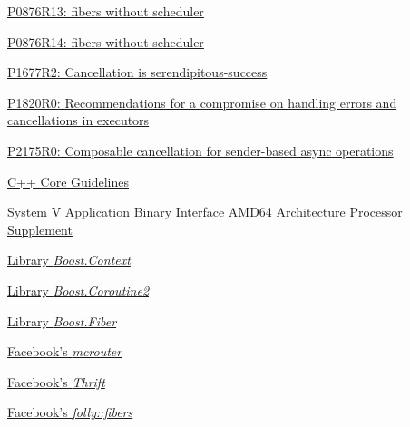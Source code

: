 \begin{thebibliography}{99}
        \href{https://www.open-std.org/jtc1/sc22/wg21/docs/papers/2023/p0876r13.pdf}
        {P0876R13: fibers without scheduler}

        \href{https://www.open-std.org/jtc1/sc22/wg21/docs/papers/2023/p0876r14.pdf}
        {P0876R14: fibers without scheduler}

        \href{https://www.open-std.org/jtc1/sc22/wg21/docs/papers/2019/p1677r2.pdf}
        {P1677R2: Cancellation is serendipitous-success}

        \href{https://www.open-std.org/jtc1/sc22/wg21/docs/papers/2019/p1820r0.html}
        {P1820R0: Recommendations for a compromise on handling errors and cancellations in executors}

        \href{https://www.open-std.org/jtc1/sc22/wg21/docs/papers/2020/p2175r0.html}
        {P2175R0: Composable cancellation for sender-based async operations}

        \href{http://isocpp.github.io/CppCoreGuidelines/CppCoreGuidelines#Ri-global}
        {C++ Core Guidelines}

        \href{http://software.intel.com/sites/default/files/article/402129/mpx-linux64-abi.pdf}
        {System V Application Binary Interface AMD64 Architecture Processor
        Supplement}

        \href{http://www.boost.org/doc/libs/release/libs/context/doc/html/index.html}
        {Library \emph{Boost.Context}}

        \href{http://www.boost.org/doc/libs/release/libs/coroutine2/doc/html/index.html}
        {Library \emph{Boost.Coroutine2}}

        \href{http://www.boost.org/doc/libs/release/libs/fiber/doc/html/index.html}
        {Library \emph{Boost.Fiber}}

        \href{https://code.facebook.com/posts/296442737213493/introducing-mcrouter-a-memcached-protocol-router-for-scaling-memcached-deployments}
        {Facebook's \emph{mcrouter}}

        \href{https://github.com/facebook/fbthrift}
        {Facebook's \emph{Thrift}}

        \href{https://github.com/facebook/folly/tree/master/folly/fibers}
        {Facebook's \emph{folly::fibers}}


\end{thebibliography}
